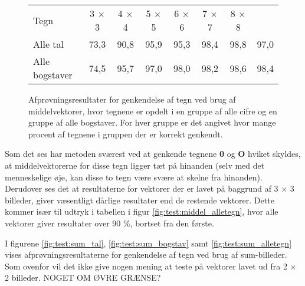 \begin{figure}[htp]
\centering
\begin{tabular}{|l|c|c|c|c|c|c|c|}\hline
\rowcolor[gray]{0.9} \multicolumn{8}{|>{\columncolor[gray]{0.9}}c|}{\textbf{Middelvektor}} \\ \hline
Tegn & 3 $\times$ 3 & 4 $\times$ 4 & 5 $\times$ 5 & 6 $\times$ 6 & 7 $\times$ 7 & 8 $\times$ 8\\\hline
Alle tal & 73,3 & 90,8 & 95,9 & 95,3 & 98,4 & 98,8 & 97,0\\\hline
Alle bogstaver & 74,5 & 95,7 & 97,0 & 98,0 & 98,2 & 98,6 & 98,4\\\hline
\end{tabular}
\caption{Afprøvningsresultater for genkendelse af tegn ved brug af middelvektorer, hvor tegnene er opdelt i en gruppe af alle cifre og en gruppe af alle bogstaver. For hver gruppe er det angivet hvor mange procent af tegnene i gruppen der er korrekt genkendt.}
\label{fig:test:middel_alletegn}
\end{figure}

Som det ses har metoden sværest ved at genkende tegnene \textbf{0} og \textbf{O} hviket skyldes, at middelvektorerne for disse tegn ligger tæt på hinanden (selv med det menneskelige øje, kan disse to tegn være svære at skelne fra hinanden). Derudover ses det at resultaterne for vektorer der er lavet på baggrund af 3 $\times$ 3 billeder, giver væsentligt dårlige resultater end de restende vektorer. Dette kommer især til udtryk i tabellen i figur \vref{fig:test:middel_alletegn}, hvor alle vektorer giver resultater over 90 \%, bortset fra den første.

I figurene \vref{fig:test:sum_tal}, \vref{fig:test:sum_bogstav} samt \vref{fig:test:sum_alletegn} vises afprøvningsresultaterne for genkendelse af tegn ved brug af sum-billeder. Som ovenfor vil det ikke give nogen mening at teste på vektorer lavet ud fra 2 $\times$ 2 billeder. NOGET OM ØVRE GRÆNSE?

